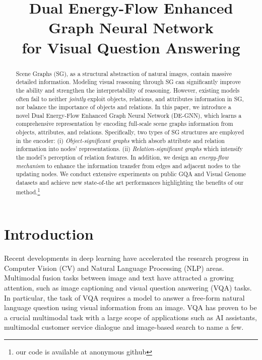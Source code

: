 \documentclass[letterpaper]{article} %
\title{Dual Energy-Flow Enhanced Graph Neural Network\\ for Visual Question Answering}
\begin{document}
\maketitle

\begin{abstract}
Scene Graphs (SG), as a structural abstraction of natural images, contain massive detailed information. 
Modeling visual reasoning through SG can significantly improve the ability and strengthen the interpretability of reasoning. 
However, existing models often fail to neither \emph{jointly} exploit objects, relations, and attributes information in SG, nor balance the importance of objects and relations. 
In this paper, we introduce a novel Dual Energy-Flow Enhanced Graph Neural Network (DE-GNN), which learns a comprehensive representation by encoding full-scale scene graphs information from objects, attributes, and relations.
Specifically, two types of SG structures are employed in the encoder: 
(i) \textit{Object-significant graphs} which absorb attribute and relation information into nodes' representations. 
(ii) \textit{Relation-significant graphs} which intensify the model's perception of relation features. 
In addition, we design an \textit{energy-flow mechanism} to enhance the information transfer from edges and adjacent nodes to the updating nodes. 
We conduct extensive experiments on public GQA and Visual Genome datasets and achieve new state-of-the art performances highlighting the benefits of our method.\footnote{our code is available at anonymous github}
\end{abstract}

\section{Introduction}
Recent developments in deep learning have accelerated the research progress in Computer Vision (CV) and Natural Language Processing (NLP) areas. 
Multimodal fusion tasks between image and text have attracted a growing attention, such as image captioning and visual question answering (VQA) tasks. 
In particular, the task of VQA requires a model to answer a free-form natural language question using visual information from an image. 
VQA has proven to be a crucial multimodal task with a large scope of applications such as AI assistants, multimodal customer service dialogue and image-based search to name a few.
\end{document}
